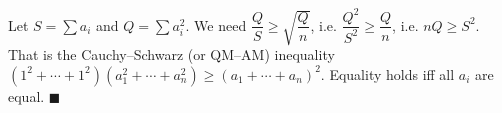 Let $S=\sum a_i$ and $Q=\sum a_i^2$. We need $\dfrac QS\ge\sqrt{\dfrac Qn}$, i.e. $\dfrac{Q^2}{S^2}\ge\dfrac Qn$, i.e. $nQ\ge S^2$. That is the Cauchy--Schwarz (or QM--AM) inequality $(1^2+\cdots+1^2)(a_1^2+\cdots+a_n^2)\ge(a_1+\cdots+a_n)^2$. Equality holds iff all $a_i$ are equal. $\blacksquare$
